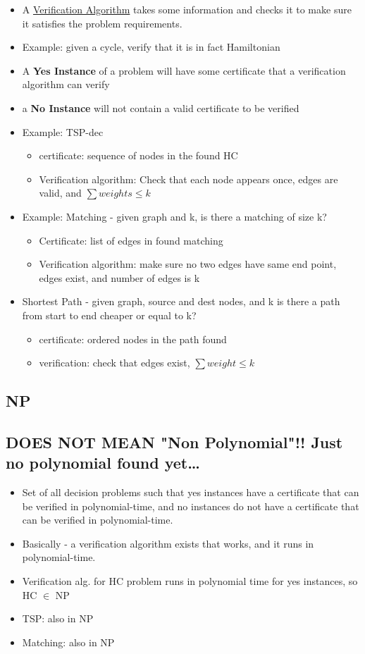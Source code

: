\documentclass[12pt, letter]{article}
\begin{document}
\begin{itemize}
	\item A \underline{Verification Algorithm} takes some information and checks it to make sure it satisfies the problem requirements.
	\item Example: given a cycle, verify that it is in fact Hamiltonian
	\item A \textbf{Yes Instance} of a problem will have some certificate that a verification algorithm can verify
	\item a  \textbf{No Instance} will not contain a valid certificate to be verified
	\item Example: TSP-dec
	\begin{itemize}
		\item certificate: sequence of nodes in the found HC
		\item Verification algorithm: Check that each node appears once, edges are valid, and $\sum weights \le k$
	\end{itemize}
	\item Example: Matching - given graph and k, is there a matching of size k?
	\begin{itemize}
		\item Certificate: list of edges in found matching
		\item Verification algorithm: make sure no two edges have same end point, edges exist, and number of edges is k
	\end{itemize}
	\item Shortest Path - given graph, source and dest nodes, and k is there a path from start to end cheaper or equal to k?
	\begin{itemize}
		\item certificate: ordered nodes in the path found
		\item verification: check that edges exist, $\sum weight \le k$
	\end{itemize}
\end{itemize}

\subsection*{NP}
\subsection*{DOES NOT MEAN "Non Polynomial"!! Just no polynomial found yet\ldots}
\begin{itemize}
	\item Set of all decision problems such that yes instances have a certificate that can be verified in polynomial-time, and no instances do not have a certificate that can be verified in polynomial-time.
	\item Basically - a verification algorithm exists that works, and it runs in polynomial-time.
	\item Verification alg. for HC problem runs in polynomial time for yes instances, so HC $\in$ NP
	\item TSP: also in NP
	\item Matching: also in NP
\end{itemize}
\end{document}
